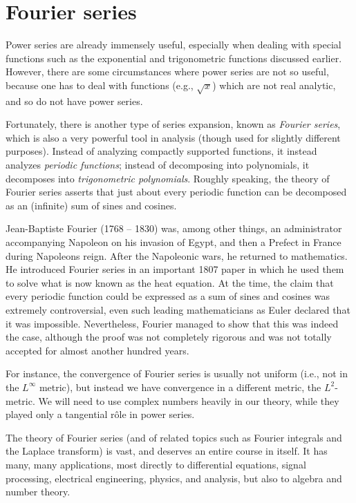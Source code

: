 \chapter{Fourier series}\label{ch 5}

\begin{note}
    Power series are already immensely useful, especially when dealing with special functions such as the exponential and trigonometric functions discussed earlier.
    However, there are some circumstances where power series are not so useful, because one has to deal with functions (e.g., \(\sqrt{x}\)) which are not real analytic, and so do not have power series.
\end{note}

\begin{note}
    Fortunately, there is another type of series expansion, known as \emph{Fourier series}, which is also a very powerful tool in analysis
    (though used for slightly different purposes).
    Instead of analyzing compactly supported functions, it instead analyzes \emph{periodic functions};
    instead of decomposing into polynomials, it decomposes into \emph{trigonometric polynomials}.
    Roughly speaking, the theory of Fourier series asserts that just about every periodic function can be decomposed as an (infinite) sum of sines and cosines.
\end{note}

\begin{remark}\label{5.0.1}
    Jean-Baptiste Fourier (1768 -- 1830) was, among other things, an administrator accompanying Napoleon on his invasion of Egypt, and then a Prefect in France during Napoleons reign.
    After the Napoleonic wars, he returned to mathematics.
    He introduced Fourier series in an important 1807 paper in which he used them to solve what is now known as the heat equation.
    At the time, the claim that every periodic function could be expressed as a sum of sines and cosines was extremely controversial, even such leading mathematicians as Euler declared that it was impossible.
    Nevertheless, Fourier managed to show that this was indeed the case, although the proof was not completely rigorous and was not totally accepted for almost another hundred years.
\end{remark}

\begin{note}
    For instance, the convergence of Fourier series is usually not uniform (i.e., not in the \(L^\infty\) metric), but instead we have convergence in a different metric, the \(L^2\)-metric.
    We will need to use complex numbers heavily in our theory, while they played only a tangential rôle in power series.
\end{note}

\begin{note}
    The theory of Fourier series (and of related topics such as Fourier integrals and the Laplace transform) is vast, and deserves an entire course in itself.
    It has many, many applications, most directly to differential equations, signal processing, electrical engineering, physics, and analysis, but also to algebra and number theory.
\end{note}

